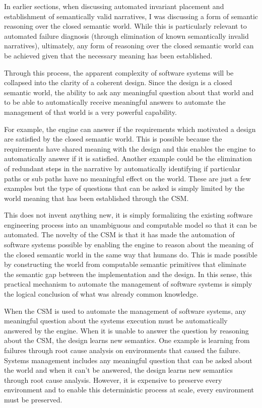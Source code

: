 In earlier sections, when discussing automated invariant placement and establishment of semantically valid narratives, I was discussing a form of semantic reasoning over the closed semantic world. While this is particularly relevant to automated failure diagnosis (through elimination of known semantically invalid narratives), ultimately, any form of reasoning over the closed semantic world can be achieved given that the necessary meaning has been established. 

Through this process, the apparent complexity of software systems will be collapsed into the clarity of a coherent design. Since the design is a closed semantic world, the ability to ask any meaningful question about that world and to be able to automatically receive meaningful answers to automate the management of that world is a very powerful capability.

For example, the engine can answer if the requirements which motivated a design are satisfied by the closed semantic world. This is possible because the requirements have shared meaning with the design and this enables the engine to automatically answer if it is satisfied. Another example could be the elimination of redundant steps in the narrative by automatically identifying if particular paths or sub paths have no meaningful effect on the world. These are just a few examples but the type of questions that can be asked is simply limited by the world meaning that has been established through the CSM.

This does not invent anything new, it is simply formalizing the existing software engineering process into an unambiguous and computable model so that it can be automated. The novelty of the CSM is that it has made the automation of software systems possible by enabling the engine to reason about the meaning of the closed semantic world in the same way that humans do. This is made possible by constructing the world from computable semantic primitives that eliminate the semantic gap between the implementation and the design. In this sense, this practical mechanism to automate the management of software systems is simply the logical conclusion of what was already common knowledge. 

When the CSM is used to automate the management of software systems, any meaningful question about the systems execution must be automatically answered by the engine. When it is unable to answer the question by reasoning about the CSM, the design learns new semantics. One example is learning from failures through root cause analysis on environments that caused the failure. Systems management includes any meaningful question that can be asked about the world and when it can't be answered, the design learns new semantics through root cause analysis. However, it is expensive to preserve every environment and to enable this deterministic process at scale, every environment must be preserved.


